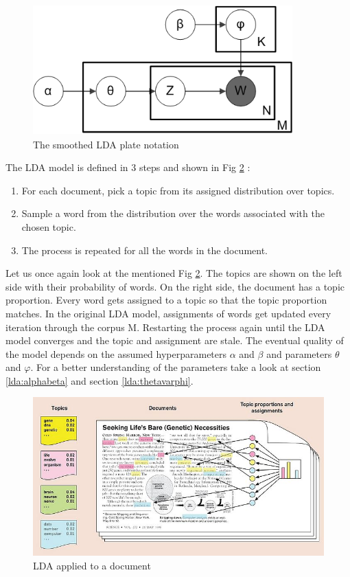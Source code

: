 \begin{figure}
    \centering
    \includegraphics[width=10cm, height=5cm]{methodology/Smoothed_LDA.png}
    \caption{The smoothed LDA plate notation}
    \label{fig:LDA}
\end{figure}

The LDA model is defined in 3 steps and shown in Fig \ref{fig:LDA_example} :
\begin{enumerate}
    \item For each document, pick a topic from its assigned distribution over topics.
    \item Sample a word from the distribution over the words associated with the chosen topic. 
    \item  The process is repeated for all the words in the document.
\end{enumerate}

Let us once again look at the mentioned Fig \ref{fig:LDA_example}. The topics are shown on the left side with their probability of words. On the right side, the document has a topic proportion. Every word gets assigned to a topic so that the topic proportion matches.  
In the original LDA model, assignments of words get updated every iteration through the corpus M. Restarting the process again until the LDA model converges and the topic and assignment are stale. The eventual quality of the model depends on the assumed hyperparameters $\alpha$ and $\beta$ and parameters $\theta$ and $\varphi$. For a better understanding of the parameters take a look at section \ref{lda:alphabeta} and section \ref{lda:thetavarphi}.

\begin{figure}
    \centering
    \includegraphics[scale=0.6]{methodology/700px-Illustrating_LDA.jpg}
    \caption{LDA applied to a document}
    \label{fig:LDA_example}
\end{figure}

